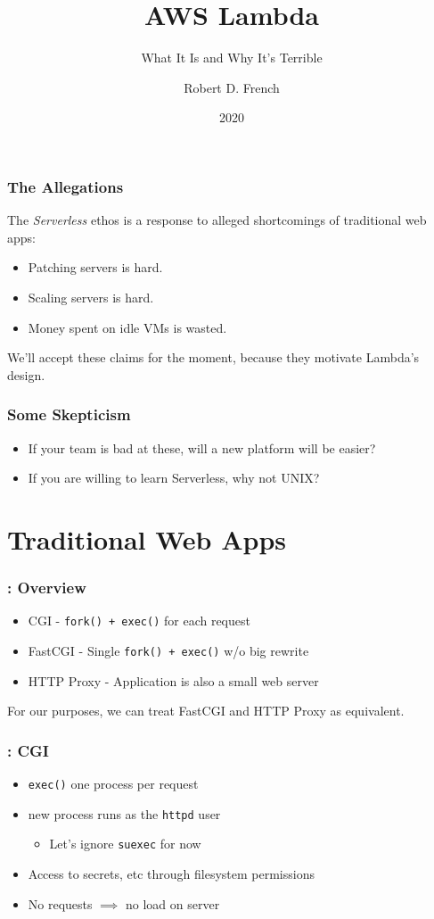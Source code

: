 \documentclass{beamer}
\title{AWS Lambda}
\subtitle{What It Is and Why It's Terrible}
\author{Robert D. French}
\institute{Old Man Yells at Cloud, Inc.}
\date{2020}
\begin{document}
\frame{\titlepage}

\begin{frame}
	\frametitle{The Allegations}
	The \emph{Serverless} ethos is a response to alleged shortcomings of traditional
	web apps:
	\begin{itemize}
		\pause \item Patching servers is hard.
		\pause \item Scaling servers is hard.
		\pause \item Money spent on idle VMs is wasted.
	\end{itemize}
	\pause
	We'll accept these claims for the moment, because they motivate Lambda's design.
\end{frame}

\begin{frame}
	\frametitle{Some Skepticism}
	\begin{itemize}
		\item If your team is bad at these, will a new platform will be easier?
		\pause \item If you are willing to learn Serverless, why not UNIX?
	\end{itemize}
\end{frame}

\section{Traditional Web Apps}
\frame{\sectionpage}

\begin{frame}
	\frametitle{\insertsection : Overview}
	\begin{itemize}
		\pause \item CGI - \texttt{fork() + exec()} for each request
		\pause \item FastCGI - Single \texttt{fork() + exec()} w/o big rewrite
		\pause \item HTTP Proxy - Application is also a small web server
	\end{itemize}
	\pause For our purposes, we can treat FastCGI and HTTP Proxy as equivalent.
\end{frame}

\begin{frame}
	\frametitle{\insertsection : CGI}
	\begin{itemize}
		\pause \item \texttt{exec()} one process per request
		\pause \item new process runs as the \texttt{httpd} user
			\begin{itemize}
				\item Let's ignore \texttt{suexec} for now
			\end{itemize}
		\pause \item Access to secrets, etc through filesystem permissions
		\pause \item No requests $\implies$ no load on server
	\end{itemize}
\end{frame}
\end{document}
